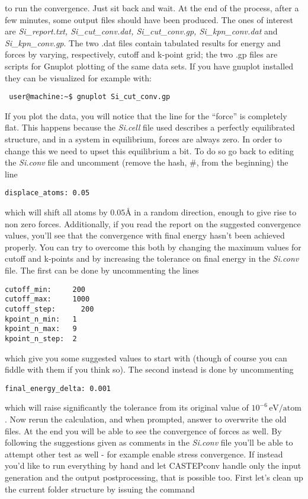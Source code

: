 \documentclass[10pt]{article}
\begin{document}
to run the convergence. Just sit back and wait. At the end of the process, after a few minutes, some output files should have been produced. The ones of interest are \textit {Si\_report.txt, Si\_cut\_conv.dat, Si\_cut\_conv.gp, Si\_kpn\_conv.dat} and \textit{Si\_kpn\_conv.gp}. The two .dat files contain tabulated results for energy and forces by varying, respectively, cutoff and k-point grid; the two .gp files are scripts for Gnuplot plotting of the same data sets. If you have gnuplot installed they can be visualized for example with:

\begin{lstlisting}
 user@machine:~$ gnuplot Si_cut_conv.gp
\end{lstlisting}

If you plot the data, you will notice that the line for the ``force'' is completely flat. This happens because the \textit{Si.cell} file used describes a perfectly equilibrated structure, and in a system in equilibrium, forces are always zero. In order to change this we need to upset this equilibrium a bit. To do so go back to editing the \textit{Si.conv} file and uncomment (remove the hash, \#, from the beginning) the line

\begin{lstlisting}
displace_atoms: 0.05
\end{lstlisting}

which will shift all atoms by $0.05 $\AA{} in a random direction, enough to give rise to non zero forces. Additionally, if you read the report on the suggested convergence values, you'll see that the convergence with final energy hasn't been achieved properly. You can try to overcome this both by changing the maximum values for cutoff and k-points and by increasing the tolerance on final energy in the \textit{Si.conv} file. The first can be done by uncommenting the lines

\begin{lstlisting}
cutoff_min:     200
cutoff_max:     1000
cutoff_step:	  200
kpoint_n_min:   1
kpoint_n_max:   9
kpoint_n_step:  2
\end{lstlisting}

which give you some suggested values to start with (though of course you can fiddle with them if you think so). The second instead is done by uncommenting

\begin{lstlisting}
final_energy_delta:	0.001
\end{lstlisting}

which will raise significantly the tolerance from its original value of $10^{-6}\,\mathrm{eV/atom}$.\newline
Now rerun the calculation, and when prompted, answer to overwrite the old files. At the end you will be able to see the convergence of forces as well. By following the suggestions given as comments in the \textit{Si.conv} file you'll be able to attempt other test as well - for example enable stress convergence.\newline
If instead you'd like to run everything by hand and let CASTEPconv handle only the input generation and the output postprocessing, that is possible too. First let's clean up the current folder structure by issuing the command
\end{document}
